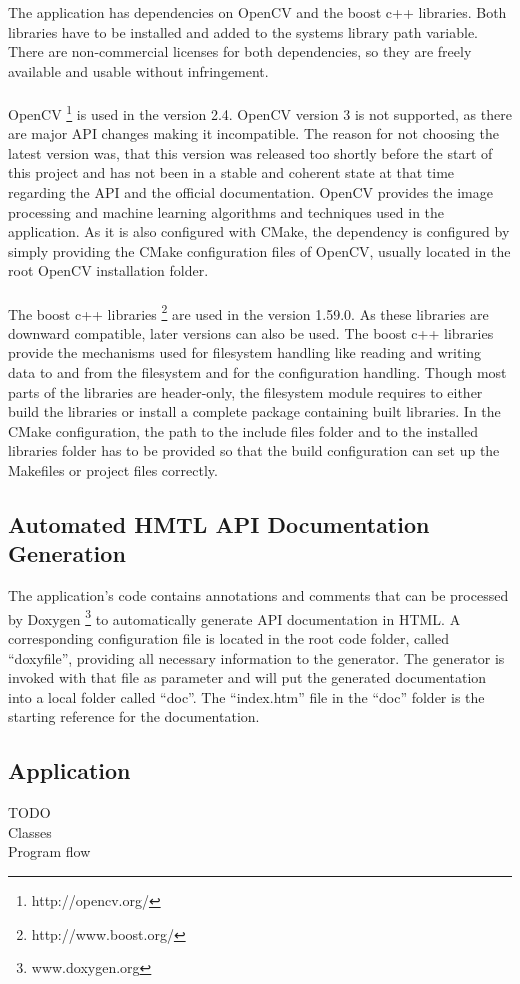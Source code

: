 The application has dependencies on OpenCV and the boost c++ libraries. Both libraries have to be installed and added to the systems library path variable. There are non-commercial licenses for both dependencies, so they are freely available and usable without infringement.
\\
\\
OpenCV \footnote{http://opencv.org/} is used in the version 2.4. OpenCV version 3 is not supported, as there are major API changes making it incompatible. The reason for not choosing the latest version was, that this version was released too shortly before the start of this project and has not been in a stable and coherent state at that time regarding the API and the official documentation. OpenCV provides the image processing and machine learning algorithms and techniques used in the application. As it is also configured with CMake, the dependency is configured by simply providing the CMake configuration files of OpenCV, usually located in the root OpenCV installation folder.
\\
\\
The boost c++ libraries \footnote{http://www.boost.org/} are used in the version 1.59.0. As these libraries are downward compatible, later versions can also be used. The boost c++ libraries provide the mechanisms used for filesystem handling like reading and writing data to and from the filesystem and for the configuration handling. Though most parts of the libraries are header-only, the filesystem module requires to either build the libraries or install a complete package containing built libraries. In the CMake configuration, the path to the include files folder and to the installed libraries folder has to be provided so that the build configuration can set up the Makefiles or project files correctly.


\subsection{Automated HMTL API Documentation Generation}

The application's code contains annotations and comments that can be processed by Doxygen \footnote{www.doxygen.org} to automatically generate API documentation in HTML. A corresponding configuration file is located in the root code folder, called "`doxyfile"', providing all necessary information to the generator. The generator is invoked with that file as parameter and will put the generated documentation into a local folder called "`doc"'. The "`index.htm"' file in the "`doc"' folder is the starting reference for the documentation.


\subsection{Application}

TODO
\\
Classes
\\
Program flow
